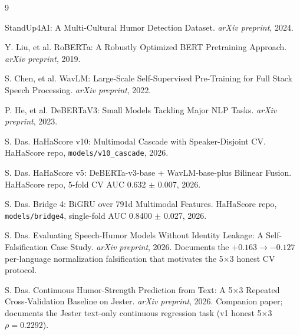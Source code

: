\documentclass[11pt, letterpaper]{article}
\begin{document}
\begin{thebibliography}{9}

StandUp4AI: A Multi-Cultural Humor Detection Dataset.
\newblock \textit{arXiv preprint}, 2024.

Y. Liu, et al.
\newblock RoBERTa: A Robustly Optimized BERT Pretraining Approach.
\newblock \textit{arXiv preprint}, 2019.

S. Chen, et al.
\newblock WavLM: Large-Scale Self-Supervised Pre-Training for Full Stack Speech Processing.
\newblock \textit{arXiv preprint}, 2022.

P. He, et al.
\newblock DeBERTaV3: Small Models Tackling Major NLP Tasks.
\newblock \textit{arXiv preprint}, 2023.

S. Das.
\newblock HaHaScore v10: Multimodal Cascade with Speaker-Disjoint CV.
\newblock HaHaScore repo, \texttt{models/v10\_cascade}, 2026.

S. Das.
\newblock HaHaScore v5: DeBERTa-v3-base + WavLM-base-plus Bilinear Fusion.
\newblock HaHaScore repo, 5-fold CV AUC 0.632 $\pm$ 0.007, 2026.

S. Das.
\newblock Bridge 4: BiGRU over 791d Multimodal Features.
\newblock HaHaScore repo, \texttt{models/bridge4}, single-fold AUC 0.8400 $\pm$ 0.027, 2026.

S. Das.
\newblock Evaluating Speech-Humor Models Without Identity Leakage: A Self-Falsification Case Study.
\newblock \textit{arXiv preprint}, 2026. Documents the $+0.163 \to -0.127$ per-language normalization falsification that motivates the 5$\times$3 honest CV protocol.

S. Das.
\newblock Continuous Humor-Strength Prediction from Text: A 5$\times$3 Repeated Cross-Validation Baseline on Jester.
\newblock \textit{arXiv preprint}, 2026. Companion paper; documents the Jester text-only continuous regression task (v1 honest 5$\times$3 $\rho = 0.2292$).

\end{thebibliography}
\end{document}
